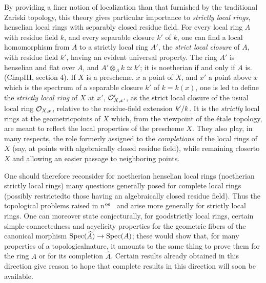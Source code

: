 By providing a finer notion of localization than that furnished by the traditional \og Zariski topology\fg, this theory gives particular importance to \emph{strictly local rings}\label{pXIII.6}, \ie henselian local rings with separably closed residue field. For every local ring $A$ with residue field $k$, and every separable closure $k'$ of $k$, one can find a local homomorphism from $A$ to a strictly local ring $A'$, the \emph{strict local closure} of $A$, with residue field $k'$, having an evident universal property. The ring $A'$ is henselian and flat over $A$, and $A'\otimes_A k\simeq k'$; it is noetherian if and only if $A$ is. (\Cf \loccit Chap\ptbl III, section 4). If $X$ is a prescheme, $x$ a point of $X$, and $x'$ a point above $x$ which is the spectrum of a separable closure $k'$ of $k=k(x)$, one is led to define the \emph{strictly local ring} of $X$ at $x'$, $\Oo'_{X,x'}$, as the strict local closure of the usual local ring $\OXx$, relative to the residue-field extension $\sisi{K'/K}{k'/k}$. It is the \emph{strictly} local rings at the \og geometric\fg points of $X$ which, from the viewpoint of the \'etale topology, are meant to reflect the local properties of the prescheme $X$. They also play, in many respects, the role formerly assigned to the \emph{completions} of the local rings of $X$ (say, at points with algebraically closed residue field), while remaining \og closer\fg to $X$ and allowing an easier passage to \og neighboring points\fg.

One should therefore reconsider for noetherian henselian local rings (\resp noetherian strictly local rings) many questions generally posed for complete local rings (possibly restricted\pageoriginale to those having an algebraically closed residue field). Thus the topological problems raised in n$^{\textup{os}}$~ and  arise more generally for strictly local rings. One can moreover state conjecturally, for \og good\fg strictly local rings, certain simple-connectedness and acyclicity properties for the geometric fibers of the canonical morphism $\Spec(\widehat{A})\to\Spec(A)$; these would show that, for many properties of a \og topological\fg nature, it amounts to the same thing to prove them for the ring $A$ or for its completion $\widehat{A}$. Certain results already obtained in this direction give reason to hope that complete results in this direction will soon be available.

